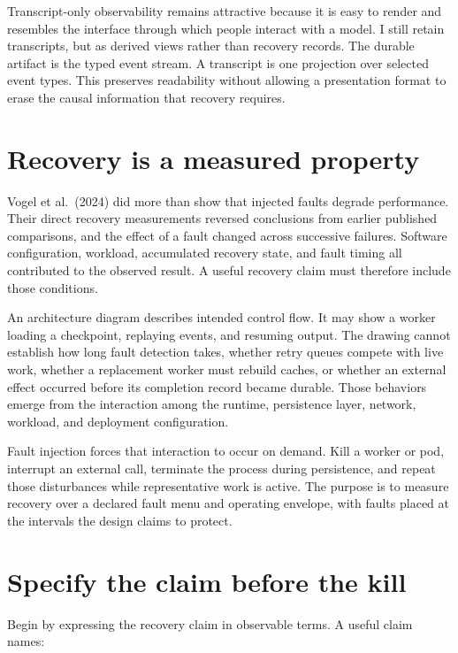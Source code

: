 Transcript-only observability remains attractive because it is easy to render and resembles the interface through which people interact with a model. I still retain transcripts, but as derived views rather than recovery records. The durable artifact is the typed event stream. A transcript is one projection over selected event types. This preserves readability without allowing a presentation format to erase the causal information that recovery requires.

\section{Recovery is a measured property}\label{recovery-is-a-measured-property}

Vogel et al.~(2024) did more than show that injected faults degrade performance. Their direct recovery measurements reversed conclusions from earlier published comparisons, and the effect of a fault changed across successive failures. Software configuration, workload, accumulated recovery state, and fault timing all contributed to the observed result. A useful recovery claim must therefore include those conditions.

An architecture diagram describes intended control flow. It may show a worker loading a checkpoint, replaying events, and resuming output. The drawing cannot establish how long fault detection takes, whether retry queues compete with live work, whether a replacement worker must rebuild caches, or whether an external effect occurred before its completion record became durable. Those behaviors emerge from the interaction among the runtime, persistence layer, network, workload, and deployment configuration.

Fault injection forces that interaction to occur on demand. Kill a worker or pod, interrupt an external call, terminate the process during persistence, and repeat those disturbances while representative work is active. The purpose is to measure recovery over a declared fault menu and operating envelope, with faults placed at the intervals the design claims to protect.

\section{Specify the claim before the kill}\label{specify-the-claim-before-the-kill}

Begin by expressing the recovery claim in observable terms. A useful claim names:


